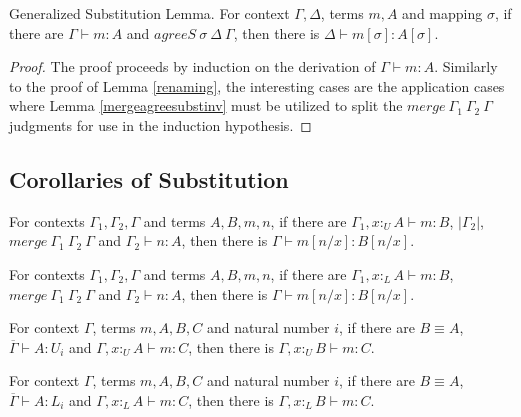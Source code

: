 \documentclass[sigplan,screen,review,anonymous]{acmart}
\newcommand{\pure}[1]{|#1|}
\newcommand{\utype}{:_{\scriptscriptstyle U}}
\newcommand{\ltype}{:_{\scriptscriptstyle L}}
\newcommand{\mrg}[3]{merge\ {#1}\ {#2}\ {#3}}
\begin{document}
\begin{lemma}
  Generalized Substitution Lemma. For context $\Gamma, \Delta$, terms $m, A$ and mapping $\sigma$, if there are $\Gamma \vdash m : A$ and $agreeS\ \sigma\ \Delta\ \Gamma$, then there is $\Delta \vdash m[\sigma] : A[\sigma]$.
\end{lemma}
\begin{proof}
  The proof proceeds by induction on the derivation of $\Gamma \vdash m : A$. Similarly to the proof of Lemma \ref{renaming}, the interesting cases are the application cases where Lemma \ref{mergeagreesubstinv} must be utilized to split the $\mrg{\Gamma_1}{\Gamma_2}{\Gamma}$ judgments for use in the induction hypothesis.
\end{proof}

\subsection{Corollaries of Substitution}

\begin{corollary}\label{substitutionu}
  For contexts $\Gamma_1, \Gamma_2, \Gamma$ and terms $A, B, m, n$, if there are $\Gamma_1, x \utype A \vdash m : B$, $\pure{\Gamma_2}$, $\mrg{\Gamma_1}{\Gamma_2}{\Gamma}$ and $\Gamma_2 \vdash n : A$, then there is $\Gamma \vdash m[n/x]: B[n/x]$.
\end{corollary}

\begin{corollary}\label{substitutionl}
  For contexts $\Gamma_1, \Gamma_2, \Gamma$ and terms $A, B, m, n$, if there are $\Gamma_1, x \ltype A \vdash m : B$, $\mrg{\Gamma_1}{\Gamma_2}{\Gamma}$ and $\Gamma_2 \vdash n : A$, then there is $\Gamma \vdash m[n/x]: B[n/x]$.
\end{corollary}

\begin{corollary}\label{contextconvu}
  For context $\Gamma$, terms $m, A, B, C$ and natural number $i$, if there are $B \equiv A$, $\overline{\Gamma} \vdash A : U_i$ and $\Gamma, x \utype A \vdash m : C$, then there is $\Gamma, x \utype B \vdash m : C$.
\end{corollary}

\begin{corollary}\label{contextconvl}
  For context $\Gamma$, terms $m, A, B, C$ and natural number $i$, if there are $B \equiv A$, $\overline{\Gamma} \vdash A : L_i$ and $\Gamma, x \ltype A \vdash m : C$, then there is $\Gamma, x \ltype B \vdash m : C$.
\end{corollary}
\end{document}
